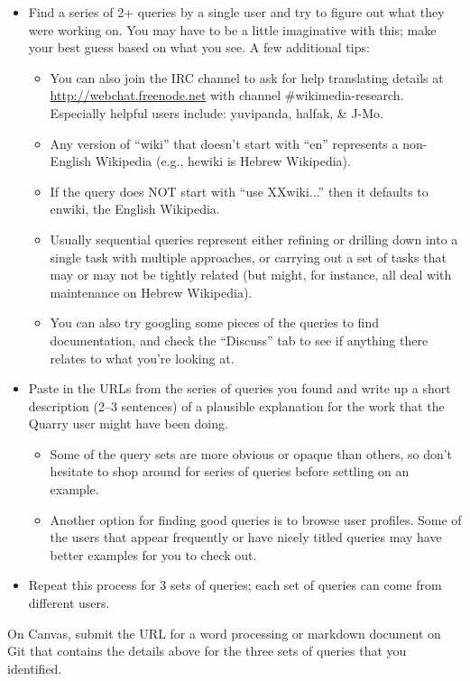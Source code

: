 \documentclass[11pt]{article}
\begin{document}
\begin{itemize}
\item Find a series of 2+ queries by a single user and try to figure out what they were working on. You may have to be a little imaginative with this; make your best guess based on what you see. A few additional tips:
\begin{itemize}
\item You can also join the IRC channel to ask for help translating details at \url{http://webchat.freenode.net} with channel \#wikimedia-research. Especially helpful users include: yuvipanda, halfak, \& J-Mo.
\item Any version of ``wiki'' that doesn't start with ``en'' represents a non-English Wikipedia (e.g., hewiki is Hebrew Wikipedia). 
\item If the query does NOT start with ``use XXwiki...'' then it defaults to enwiki, the English Wikipedia. 
\item Usually sequential queries represent either refining or drilling down into a single task with multiple approaches, or carrying out a set of tasks that may or may not be tightly related (but might, for instance, all deal with maintenance on Hebrew Wikipedia).
\item You can also try googling some pieces of the queries to find documentation, and check the ``Discuss'' tab to see if anything there relates to what you're looking at.
\end{itemize}
\item Paste in the URLs from the series of queries you found and write up a short description (2--3 sentences) of a plausible explanation for the work that the Quarry user might have been doing. 
\begin{itemize}
\item Some of the query sets are more obvious or opaque than others, so don't hesitate to shop around for series of queries before settling on an example. 
\item Another option for finding good queries is to browse user profiles. Some of the users that appear frequently or have nicely titled queries may have better examples for you to check out.
\end{itemize}
\item Repeat this process for 3 sets of queries; each set of queries can come from different users.
\end{itemize}

On Canvas, submit the URL for a word processing or markdown document on Git that contains the details above for the three sets of queries that you identified.
\end{document}
